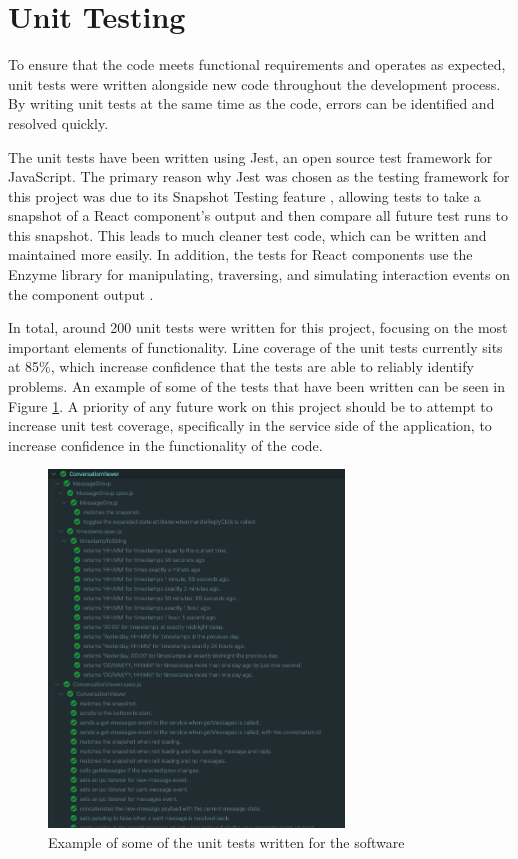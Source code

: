\section{Unit Testing}
To ensure that the code meets functional requirements and operates as expected, unit tests were written alongside new code throughout the development process. By writing unit tests at the same time as the code, errors can be identified and resolved quickly. 

The unit tests have been written using Jest, an open source test framework for JavaScript. The primary reason why Jest was chosen as the testing framework for this project was due to its Snapshot Testing feature \cite{jest-snapshot}, allowing tests to take a snapshot of a React component's output and then compare all future test runs to this snapshot. This leads to much cleaner test code, which can be written and maintained more easily. In addition, the tests for React components use the Enzyme library for manipulating, traversing, and simulating interaction events on the component output \cite{enzyme}. 

In total, around 200 unit tests were written for this project, focusing on the most important elements of functionality. Line coverage of the unit tests currently sits at 85\%, which increase confidence that the tests are able to reliably identify problems. An example of some of the tests that have been written can be seen in Figure \ref{fig:test-results}. A priority of any future work on this project should be to attempt to increase unit test coverage, specifically in the service side of the application, to increase confidence in the functionality of the code.

\begin{figure}[h!]
  \centering
  \includegraphics[width=0.7\textwidth]{images/test-results2.png}
  \caption{Example of some of the unit tests written for the software}
  \label{fig:test-results}
\end{figure}

